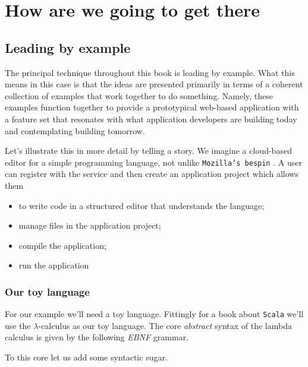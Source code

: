 \section{How are we going to get there}

\subsection{Leading by example}

The principal technique throughout this book is leading by
example. What this means in this case is that the ideas are presented
primarily in terms of a coherent collection of examples that work
together to do something. Namely, these examples function together to
provide a prototypical web-based application with a feature set that
resonates with what application developers are building today and
contemplating building tomorrow.

Let's illustrate this in more detail by telling a story. We imagine a
cloud-based editor for a simple programming language, not unlike
\texttt{Mozilla's bespin} . A user can register with the service and
then create an application project which allows them
\begin{itemize}
   \item to write code in a structured editor that understands the language;
   \item manage files in the application project;
   \item compile the application;
   \item run the application
\end{itemize}

\subsubsection{Our toy language}

For our example we'll need a toy language. Fittingly for a book about
\texttt{Scala} we'll use the $\lambda$-calculus as our toy
language. The core \textit{abstract} syntax of the lambda calculus is
given by the following \textit{EBNF} grammar.


To this core let us add some syntactic sugar.

